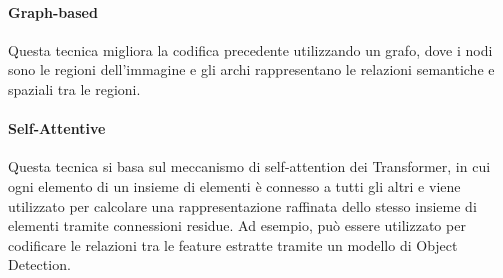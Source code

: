 \paragraph{Graph-based}
Questa tecnica migliora la codifica precedente utilizzando un grafo, dove i nodi sono le regioni dell'immagine e gli archi rappresentano le relazioni semantiche e spaziali tra le regioni.
\paragraph{Self-Attentive}
Questa tecnica si basa sul meccanismo di self-attention \cite{vaswani2017attention} dei Transformer, in cui ogni elemento di un insieme di elementi è connesso a tutti gli altri e viene utilizzato per calcolare una rappresentazione raffinata dello stesso insieme di elementi tramite connessioni residue. Ad esempio, può essere utilizzato per codificare le relazioni tra le feature estratte tramite un modello di Object Detection.


